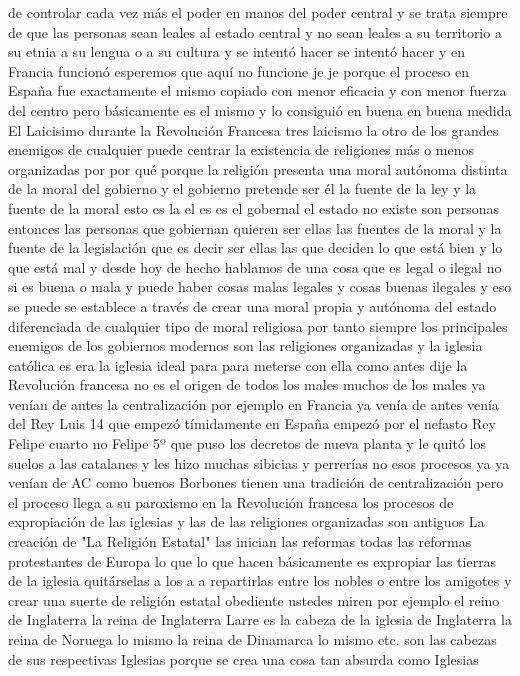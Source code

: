 de controlar cada vez más el poder en manos del poder central
y se trata siempre de que las personas sean leales al estado central y no sean leales a su territorio
a su etnia a su lengua o a su cultura y se intentó hacer
se intentó hacer y en Francia funcionó esperemos que aquí no funcione je je
porque el proceso en España fue exactamente el mismo copiado con menor eficacia y con menor fuerza del centro
pero básicamente es el mismo y lo consiguió en buena en buena medida
El Laicisimo durante la Revolución Francesa
tres laicismo la
otro de los grandes enemigos de cualquier puede centrar la existencia de religiones más o menos organizadas
por por qué porque la religión presenta una moral autónoma distinta de la moral del gobierno
y el gobierno pretende ser él la fuente de la ley y la fuente de la moral esto es la el es es el gobernal
el estado no existe son personas entonces las personas que gobiernan quieren ser ellas las fuentes de la moral
y la fuente de la legislación que es decir ser ellas las que deciden lo que está bien y lo que está mal y desde hoy
de hecho hablamos de una cosa que es legal o ilegal no si es buena o mala y puede haber cosas malas legales y cosas buenas
ilegales y eso se puede se establece a través de crear una moral propia y autónoma del estado
diferenciada de cualquier tipo de moral religiosa por tanto siempre los principales enemigos de los gobiernos modernos
son las religiones organizadas y la iglesia católica es era la iglesia ideal para para meterse con ella
como antes dije la Revolución francesa no es el origen de todos los males muchos de los males ya venían de antes
la centralización por ejemplo en Francia ya venía de antes venía del Rey Luis 14 que empezó tímidamente en España empezó
por el nefasto Rey Felipe cuarto no Felipe 5º
que puso los decretos de nueva planta y le quitó los suelos a las catalanes y les hizo muchas sibicias y perrerías
no esos procesos ya ya venían de AC como buenos Borbones tienen una tradición de centralización pero el proceso llega a su paroxismo
en la Revolución francesa los procesos de expropiación de las iglesias y las de las religiones organizadas son antiguos
La creación de "La Religión Estatal"
las inician las reformas todas las reformas protestantes de Europa lo que lo que hacen básicamente es expropiar las tierras de la iglesia
quitárselas a los a a repartirlas entre los nobles o entre los amigotes y crear una suerte de religión estatal obediente
ustedes miren por ejemplo el reino de Inglaterra la reina de Inglaterra Larre es la cabeza de la iglesia de Inglaterra
la reina de Noruega lo mismo la reina de Dinamarca lo mismo etc. son las cabezas de sus respectivas Iglesias porque se crea una cosa tan absurda como Iglesias
